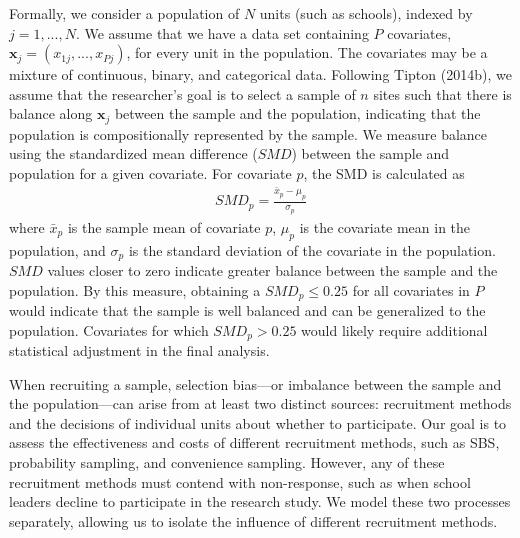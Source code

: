 \documentclass[
  man,floatsintext]{apa6}
\begin{document}
Formally, we consider a population of \(N\) units (such as schools), indexed by \(j = 1,...,N\).
We assume that we have a data set containing \(P\) covariates, \(\mathbf{x}_j = \left(x_{1j},...,x_{Pj}\right)\), for every unit in the population. The covariates may be a mixture of continuous, binary, and categorical data.
Following Tipton (2014b), we assume that the researcher's goal is to select a sample of \(n\) sites such that there is balance along \(\mathbf{x}_j\) between the sample and the population, indicating that the population is compositionally represented by the sample.
We measure balance using the standardized mean difference (\(SMD\)) between the sample and population for a given covariate. For covariate \(p\), the SMD is calculated as
\begin{align} \label{eq:SMD}
SMD_p = \frac{\bar{x}_p - \mu_p}{\sigma_p}
\end{align}
where \(\bar{x}_p\) is the sample mean of covariate \(p\), \(\mu_p\) is the covariate mean in the population, and \(\sigma_p\) is the standard deviation of the covariate in the population. \(SMD\) values closer to zero indicate greater balance between the sample and the population. By this measure, obtaining a \(SMD_p \le 0.25\) for all covariates in \(P\) would indicate that the sample is well balanced and can be generalized to the population. Covariates for which \(SMD_p > 0.25\) would likely require additional statistical adjustment in the final analysis.

When recruiting a sample, selection bias---or imbalance between the sample and the population---can arise from at least two distinct sources: recruitment methods and the decisions of individual units about whether to participate. Our goal is to assess the effectiveness and costs of different recruitment methods, such as SBS, probability sampling, and convenience sampling. However, any of these recruitment methods must contend with non-response, such as when school leaders decline to participate in the research study.
We model these two processes separately, allowing us to isolate the influence of different recruitment methods.
\end{document}
